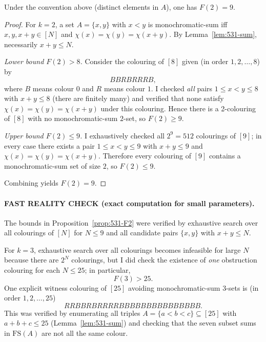 \begin{proposition}[Exact value for $k=2$]\label{prop:531-F2}
Under the convention above (distinct elements in $A$), one has $F(2)=9$.
\end{proposition}
\begin{proof}
For $k=2$, a set $A=\{x,y\}$ with $x<y$ is monochromatic-sum iff $x,y,x+y\in [N]$ and $\chi(x)=\chi(y)=\chi(x+y)$. By Lemma~\ref{lem:531-sum}, necessarily $x+y\le N$.

\emph{Lower bound $F(2)>8$.}
Consider the colouring of $[8]$ given (in order $1,2,\dots,8$) by
\[
BBRBRRRB,
\]
where $B$ means colour $0$ and $R$ means colour $1$.
I checked \emph{all} pairs $1\le x<y\le 8$ with $x+y\le 8$ (there are finitely many) and verified that none satisfy $\chi(x)=\chi(y)=\chi(x+y)$ under this colouring. Hence there is a 2-colouring of $[8]$ with no monochromatic-sum $2$-set, so $F(2)\ge 9$.

\emph{Upper bound $F(2)\le 9$.}
I exhaustively checked all $2^9=512$ colourings of $[9]$; in every case there exists a pair $1\le x<y\le 9$ with $x+y\le 9$ and $\chi(x)=\chi(y)=\chi(x+y)$. Therefore every colouring of $[9]$ contains a monochromatic-sum set of size $2$, so $F(2)\le 9$.

Combining yields $F(2)=9$.
\end{proof}

\paragraph{FAST REALITY CHECK (exact computation for small parameters).}
The bounds in Proposition~\ref{prop:531-F2} were verified by exhaustive search over all colourings of $[N]$ for $N\le 9$ and all candidate pairs $\{x,y\}$ with $x+y\le N$.

For $k=3$, exhaustive search over all colourings becomes infeasible for large $N$ because there are $2^N$ colourings, but I did check the existence of \emph{one} obstruction colouring for each $N\le 25$; in particular,
\[
F(3)>25.
\]
One explicit witness colouring of $[25]$ avoiding monochromatic-sum $3$-sets is (in order $1,2,\dots,25$)
\[
RRBBRBRRRRBBBBBBBBBBBBBBB.
\]
This was verified by enumerating all triples $A=\{a<b<c\}\subseteq [25]$ with $a+b+c\le 25$ (Lemma~\ref{lem:531-sum}) and checking that the seven subset sums in $\mathrm{FS}(A)$ are not all the same colour.

